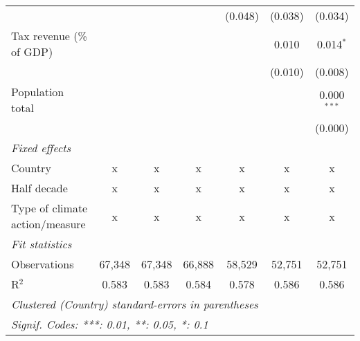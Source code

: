 \begin{tabular}{lcccccc}
                                                  &         &                &                & (0.048)        & (0.038)        & (0.034)\\   
   Tax revenue (\% of GDP)                        &         &                &                &                & 0.010          & 0.014$^{*}$\\   
                                                  &         &                &                &                & (0.010)        & (0.008)\\   
   Population total                               &         &                &                &                &                & 0.000$^{***}$\\   
                                                  &         &                &                &                &                & (0.000)\\   
   \emph{Fixed effects}\\
   Country                                        & x       & x              & x              & x              & x              & x\\  
   Half decade                                    & x       & x              & x              & x              & x              & x\\  
   Type of climate action/measure                 & x       & x              & x              & x              & x              & x\\  
   \midrule \emph{Fit statistics}\\
   Observations                                   & 67,348  & 67,348         & 66,888         & 58,529         & 52,751         & 52,751\\  
   R$^2$                                          & 0.583   & 0.583          & 0.584          & 0.578          & 0.586          & 0.586\\  
   \midrule
   \multicolumn{7}{l}{\emph{Clustered (Country) standard-errors in parentheses}}\\
   \multicolumn{7}{l}{\emph{Signif. Codes: ***: 0.01, **: 0.05, *: 0.1}}\\
\end{tabular}
\par\endgroup


